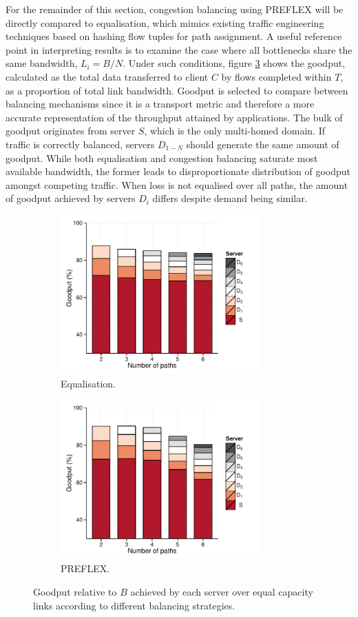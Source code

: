 For the remainder of this section, congestion balancing using \ac{PREFLEX} will be directly compared to equalisation, which mimics existing traffic engineering techniques based on hashing flow tuples for path assignment.
A useful reference point in interpreting results is to examine the case where all bottlenecks share the same bandwidth, $L_i=B/N$.
Under such conditions, figure \ref{fig:goodputeq} shows the goodput, calculated as the total data transferred to client $C$ by flows completed within $T$, as a proportion of total link bandwidth.
Goodput is selected to compare between balancing mechanisms since it is a transport metric and therefore a more accurate representation of the throughput attained by applications.
The bulk of goodput originates from server $S$, which is the only multi-homed domain.
If traffic is correctly balanced, servers $D_{1-N}$ should generate the same amount of goodput.
While both equalisation and congestion balancing saturate most available bandwidth, the former leads to disproportionate distribution of goodput amongst competing traffic. 
When loss is not equalised over all paths, the amount of goodput achieved by servers $D_i$ differs despite demand being similar.

\begin{figure}
    \centering
    \begin{subfigure}[b]{.5\linewidth}
        \centering
        \includegraphics[width=3.0in]{figures/cate/equal-equal}
        \caption{\label{eqeq}Equalisation.}
    \end{subfigure}%
    \begin{subfigure}[b]{.5\linewidth}
        \centering
        \includegraphics[width=3.0in]{figures/cate/preflex-equal}
        \caption{\label{preflexeq}PREFLEX.}
    \end{subfigure}
    \caption[Goodput achieved over equal capacity links.]{Goodput relative to $B$ achieved by each server over equal capacity links according to different balancing strategies.\label{fig:goodputeq}}
\end{figure}

